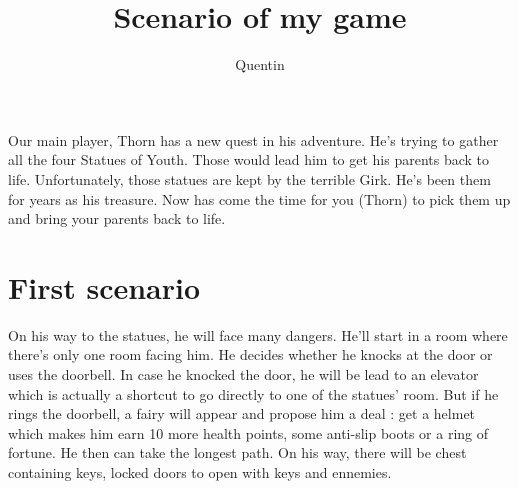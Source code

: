 \documentclass{article}
\title{\Large{Scenario of my game}}
\author{Quentin}
\date{}
\begin{document}
\maketitle

Our main player, Thorn has a new quest in his adventure. He's trying to gather all the four Statues of Youth. Those would lead him to get his parents back to life. Unfortunately, those statues are kept by the terrible Girk. He's been them for years as his treasure. Now has come the time for you (Thorn) to pick them up and bring your parents back to life.

\section{First scenario}

On his way to the statues, he will face many dangers. He'll start in a room where there's only one room facing him. He decides whether he knocks at the door or uses the doorbell. In case he knocked the door, he will be lead to an elevator which is actually a shortcut to go directly to one of the statues' room. But if he rings the doorbell, a fairy will appear and propose him a deal : get a helmet which makes him earn 10 more health points, some anti-slip boots or a ring of fortune. He then can take the longest path. On his way, there will be chest containing keys, locked doors to open with keys and ennemies.
\end{document}
